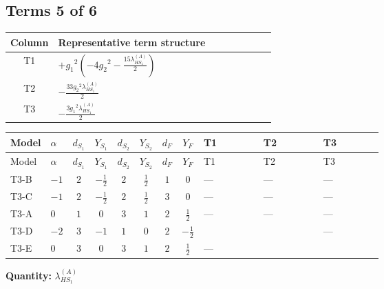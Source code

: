 \documentclass[8pt]{article}
\begin{document}
\begin{landscape}
\subsection*{Terms 5 of 6}
\begin{center}
\begin{tabular}{@{}c >{\raggedright\arraybackslash}p{0.82\linewidth}@{}}
\toprule
Column & Representative term structure \\
\midrule
T1 & \(\displaystyle +{g_1}^2 \left(-4 {g_2}^2-\frac{15 {\lambda_{HS_1}^{(A)}}}{2}\right)\) \\
\midrule
T2 & \(\displaystyle -\frac{33 {g_2}^2 {\lambda_{HS_1}^{(A)}}}{2}\) \\
\midrule
T3 & \(\displaystyle -\frac{3 {g_1}^2 {\lambda_{HS_1}^{(A)}}}{2}\) \\
\midrule
\bottomrule
\end{tabular}
\end{center}
\smallskip
\tiny
\begin{longtable}{@{}llcccccc >{\raggedright\arraybackslash}p{0.21\linewidth} >{\raggedright\arraybackslash}p{0.21\linewidth} >{\raggedright\arraybackslash}p{0.21\linewidth}@{}}
\toprule
Model & $\alpha$ & $d_{S_1}$ & $Y_{S_1}$ & $d_{S_2}$ & $Y_{S_2}$ & $d_F$ & $Y_F$ & T1 & T2 & T3 \\
\midrule
\endfirsthead
\toprule
Model & $\alpha$ & $d_{S_1}$ & $Y_{S_1}$ & $d_{S_2}$ & $Y_{S_2}$ & $d_F$ & $Y_F$ & T1 & T2 & T3 \\
\midrule
\endhead
T3-B & $-1$ & $2$ & $-\frac{1}{2}$ & $2$ & $\frac{1}{2}$ & $1$ & $0$ & --- & --- & --- \\
\midrule
T3-C & $-1$ & $2$ & $-\frac{1}{2}$ & $2$ & $\frac{1}{2}$ & $3$ & $0$ & --- & --- & --- \\
\midrule
T3-A & $0$ & $1$ & $0$ & $3$ & $1$ & $2$ & $\frac{1}{2}$ & --- & --- & --- \\
\midrule
T3-D & $-2$ & $3$ & $-1$ & $1$ & $0$ & $2$ & $-\frac{1}{2}$ & \scriptsize\adjustbox{max width=\linewidth}{$\begin{gathered} +{g_1}^2 \left(-4 {g_2}^2-\frac{15 {\lambda_{HS_1}^{(A)}}}{2}\right)\end{gathered}$} & \scriptsize\adjustbox{max width=\linewidth}{$\begin{gathered} -\frac{33 {g_2}^2 {\lambda_{HS_1}^{(A)}}}{2}\end{gathered}$} & --- \\
\midrule
T3-E & $0$ & $3$ & $0$ & $3$ & $1$ & $2$ & $\frac{1}{2}$ & --- & \scriptsize\adjustbox{max width=\linewidth}{$\begin{gathered} -\frac{33 {g_2}^2 {\lambda_{HS_1}^{(A)}}}{2}\end{gathered}$} & \scriptsize\adjustbox{max width=\linewidth}{$\begin{gathered} -\frac{3 {g_1}^2 {\lambda_{HS_1}^{(A)}}}{2}\end{gathered}$} \\
\midrule
\bottomrule
\end{longtable}
\clearpage
\noindent\textbf{Quantity: }$\lambda_{HS_1}^{(A)}$\par\smallskip

\end{landscape}
\end{document}
